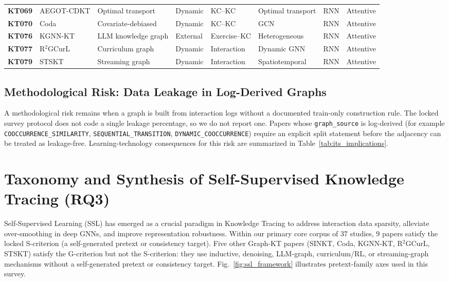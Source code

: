 \documentclass[lettersize,journal]{IEEEtran}
\begin{document}
\begin{table}[t]
\begin{tabular}{@{}ll>{\raggedright\arraybackslash}p{2.15cm}l>{\raggedright\arraybackslash}p{1.55cm}lll@{}}
\textbf{KT069} & AEGOT-CDKT \cite{KT069_AEGOTCDKT_2025} & Optimal transport & Dynamic & KC--KC & Optimal transport & RNN & Attentive \\
\textbf{KT070} & Coda \cite{KT070_Coda_2025} & Covariate-debiased & Dynamic & KC--KC & GCN & RNN & Attentive \\
\textbf{KT076} & KGNN-KT \cite{KT076_KGNNKT_2025} & LLM knowledge graph & External & Exercise--KC & Heterogeneous & RNN & Attentive \\
\textbf{KT077} & R$^2$GCurL \cite{KT077_R2GCurL_2026} & Curriculum graph & Dynamic & Interaction & Dynamic GNN & RNN & Attentive \\
\textbf{KT079} & STSKT \cite{KT079_STGSKT_2026} & Streaming graph & Dynamic & Interaction & Spatiotemporal & RNN & Attentive \\
\bottomrule
\end{tabular}
\end{table}

\subsection{Methodological Risk: Data Leakage in Log-Derived Graphs}
A methodological risk remains when a graph is built from interaction logs without a documented train-only construction rule. The locked survey protocol does not code a single leakage percentage, so we do not report one. Papers whose \texttt{graph\_source} is log-derived (for example \texttt{COOCCURRENCE\_SIMILARITY}, \texttt{SEQUENTIAL\_TRANSITION}, \texttt{DYNAMIC\_COOCCURRENCE}) require an explicit split statement before the adjacency can be treated as leakage-free. Learning-technology consequences for this risk are summarized in Table~\ref{tab:its_implications}.

\section{Taxonomy and Synthesis of Self-Supervised Knowledge Tracing (RQ3)}
\label{sec:ssl_kt}

Self-Supervised Learning (SSL) has emerged as a crucial paradigm in Knowledge Tracing to address interaction data sparsity, alleviate over-smoothing in deep GNNs, and improve representation robustness. Within our primary core corpus of 37 studies, 9 papers satisfy the locked S-criterion (a self-generated pretext or consistency target). Five other Graph-KT papers (SINKT, Coda, KGNN-KT, R$^2$GCurL, STSKT) satisfy the G-criterion but not the S-criterion: they use inductive, denoising, LLM-graph, curriculum/RL, or streaming-graph mechanisms without a self-generated pretext or consistency target. Fig.~\ref{fig:ssl_framework} illustrates pretext-family axes used in this survey.
\end{document}
